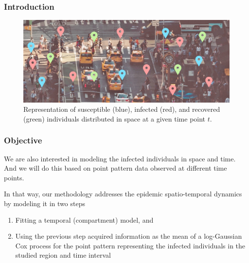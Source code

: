 \documentclass[12pt, aspectratio = 169]{beamer} %
\begin{document}
	\begin{frame}[t]
		\frametitle{Introduction}
		\justifying
		
		\begin{figure}[!ht]
			\centering
			\includegraphics[width = 1\textwidth]{Images/SIR_image.jpeg}\vspace{-6pt}
			\caption{\justifying Representation of susceptible (blue), infected (red), and recovered (green) individuals distributed in space at a given time point $t$.}
			\label{fig:SIRimage}
		\end{figure}
		
	\end{frame}

	\begin{frame}[t]
		\frametitle{Objective}
		\justifying
		
		We are also interested in modeling the infected individuals in space and time. And we will do this based on point pattern data observed at different time points.
		
		\pause
		
		In that way, our methodology addresses the epidemic spatio-temporal dynamics by modeling it in two steps
		
		\begin{enumerate}
			\justifying
			\item Fitting a temporal (compartment) model, and
			\item Using the previous step acquired information as the mean of a log-Gaussian Cox process for the point pattern representing the infected individuals in the studied region and time interval
		\end{enumerate}
		
	\end{frame}
\end{document}
